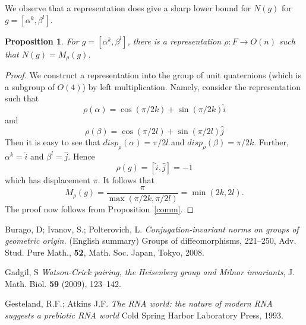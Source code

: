 \documentclass{amsart}
\theoremstyle{plain}
\newtheorem{proposition}[theorem]{Proposition}
\theoremstyle{definition}
\theoremstyle{remark}
\renewcommand{\a}{\alpha}
\renewcommand{\b}{\beta}
\begin{document}
We observe that a representation does give a sharp lower bound for $N(g)$ for $g=[\a^k,\b^l]$.

\begin{proposition}
For $g=[\a^k,\b^l]$, there is a representation $\rho:F\to O(n)$ such that $N(g)=M_\rho(g)$.
\end{proposition}
\begin{proof}
We construct a representation into the group of unit quaternions (which is a subgroup of $O(4)$) by left multiplication. Namely, consider the representation such that 
$$\rho(\a)=\cos(\pi/2k)+\sin(\pi/2k)\widehat{i}$$
and 
$$\rho(\b)=\cos(\pi/2l)+\sin(\pi/2l)\widehat{j}$$
Then it is easy to see that $disp_\rho(\a)=\pi/2l$ and $disp_\rho(\b)=\pi/2k$.
Further, $\a^k=\widehat{i}$ and $\b^l=\widehat{j}$. Hence
$$\rho(g)=[\widehat{i},\widehat{j}]=-1$$
which has displacement $\pi$. It follows that 
$$M_\rho(g)=\frac{\pi}{\max(\pi/2k,\pi/2l)}=\min(2k,2l).$$
The proof now follows from Proposition~\ref{comm}.
 
\end{proof}


\begin{thebibliography}{10}

 Burago, D; Ivanov, S.; Polterovich, L.
\textit{Conjugation-invariant norms on groups of geometric origin.} (English summary) Groups of diffeomorphisms, 221--250, 
Adv. Stud. Pure Math., \textbf{52}, Math. Soc. Japan, Tokyo, 2008.


 Gadgil, S \textit{Watson-Crick pairing, the Heisenberg group and Milnor invariants}, J. Math. Biol. \textbf{59} (2009),  123--142.

 Gesteland, R.F.; Atkins J.F. \textit{The RNA world: the
nature of modern RNA suggests a prebiotic RNA world} Cold
Spring Harbor Laboratory Press, 1993.


\end{thebibliography}
\end{document}
